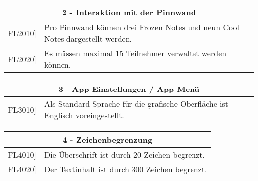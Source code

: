 \documentclass[a4paper]{scrreprt}
\begin{document}
    		\vspace{5mm}
    		
    		\begin{table}[h!]
    			\centering
    			\label{my-label}
    			\begin{tabular}{p{2cm}p{12cm}}
    				
    				\multicolumn{2}{c}{\textbf{2 - Interaktion mit der Pinnwand}} \\ \hline
    				\centering{[}FL2010{]} & Pro Pinnwand können drei Frozen Notes und neun Cool Notes dargestellt werden.\\
    				\centering{[}FL2020{]}& Es müssen maximal 15 Teilnehmer verwaltet werden können.                             \\ 
    				\hline
    			\end{tabular}
    		\end{table}
    		
    		\vspace{5mm}
    		
    		\begin{table}[h!]
    			\centering
    			\label{my-label}
    			\begin{tabular}{p{2cm}p{12cm}}
    				
    				\multicolumn{2}{c}{\textbf{3 - App Einstellungen / App-Menü}} \\ \hline
    				\centering{[}FL3010{]} & Als Standard-Sprache für die grafische Oberfläche ist Englisch voreingestellt.\\
    				\hline
    			\end{tabular}
    		\end{table}
    		
    		\vspace{5mm}
    		
    		\begin{table}[h!]
    			\centering
    			\label{my-label}
    			\begin{tabular}{p{2cm}p{12cm}}
    				
    				\multicolumn{2}{c}{\textbf{4 - Zeichenbegrenzung}} \\ \hline
    				\centering{[}FL4010{]} & Die Überschrift ist durch 20 Zeichen begrenzt.\\
    				\centering{[}FL4020{]}& Der Textinhalt ist durch 300 Zeichen begrenzt.                              \\
    				\hline
    			\end{tabular}
    		\end{table}
    		
\end{document}
